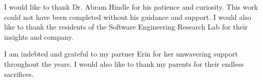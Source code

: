\documentclass[\main/thesis.tex]{subfiles}
\begin{document}

\begin{acknowledgements} 

I would like to thank Dr. Abram Hindle for his patience and curiosity. This work could not have been completed without his guidance and support. I would also like to thank the residents of the Software Engineering Research Lab for their insights and company. 

I am indebted and grateful to my partner Erin for her unwavering support throughout the years. I would also like to thank my parents for their endless sacrifices. 



\end{acknowledgements}
\end{document}
